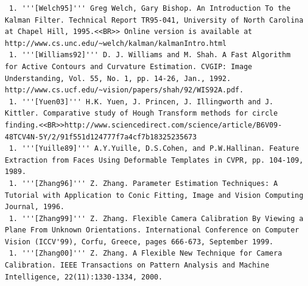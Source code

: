 \begin{verbatim}
 1. '''[Welch95]''' Greg Welch, Gary Bishop. An Introduction To the Kalman Filter. Technical Report TR95-041, University of North Carolina at Chapel Hill, 1995.<<BR>> Online version is available at http://www.cs.unc.edu/~welch/kalman/kalmanIntro.html
 1. '''[Williams92]''' D. J. Williams and M. Shah. A Fast Algorithm for Active Contours and Curvature Estimation. CVGIP: Image Understanding, Vol. 55, No. 1, pp. 14-26, Jan., 1992. http://www.cs.ucf.edu/~vision/papers/shah/92/WIS92A.pdf.
 1. '''[Yuen03]''' H.K. Yuen, J. Princen, J. Illingworth and J. Kittler. Comparative study of Hough Transform methods for circle finding.<<BR>>http://www.sciencedirect.com/science/article/B6V09-48TCV4N-5Y/2/91f551d124777f7a4cf7b18325235673
 1. '''[Yuille89]''' A.Y.Yuille, D.S.Cohen, and P.W.Hallinan. Feature Extraction from Faces Using Deformable Templates in CVPR, pp. 104-109, 1989.
 1. '''[Zhang96]''' Z. Zhang. Parameter Estimation Techniques: A Tutorial with Application to Conic Fitting, Image and Vision Computing Journal, 1996.
 1. '''[Zhang99]''' Z. Zhang. Flexible Camera Calibration By Viewing a Plane From Unknown Orientations. International Conference on Computer Vision (ICCV'99), Corfu, Greece, pages 666-673, September 1999.
 1. '''[Zhang00]''' Z. Zhang. A Flexible New Technique for Camera Calibration. IEEE Transactions on Pattern Analysis and Machine Intelligence, 22(11):1330-1334, 2000.
\end{verbatim}
